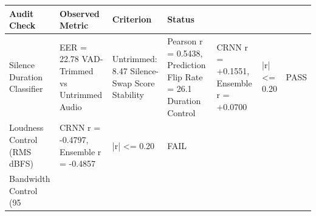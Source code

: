 \begin{tabular}{llll}
\toprule
Audit Check & Observed Metric & Criterion & Status \\
\midrule
Silence Duration Classifier & EER = 22.78%
VAD-Trimmed vs Untrimmed Audio & Untrimmed: 8.47%
Silence-Swap Score Stability & Pearson r = 0.5438, Prediction Flip Rate = 26.1%
Duration Control & CRNN r = +0.1551, Ensemble r = +0.0700 & |r| <= 0.20 & PASS \\
Loudness Control (RMS dBFS) & CRNN r = -0.4797, Ensemble r = -0.4857 & |r| <= 0.20 & FAIL \\
Bandwidth Control (95%
\bottomrule
\end{tabular}

